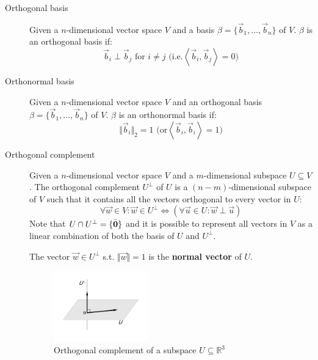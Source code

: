 \begin{description}
    \item[Orthogonal basis] 
        Given a $n$-dimensional vector space $V$ and a basis $\beta = \{ \vec{b}_1, \dots, \vec{b}_n \}$ of $V$.
        $\beta$ is an orthogonal basis if:
        \[ \vec{b}_i \perp \vec{b}_j \text{ for } i \neq j \text{ (i.e.} \left\langle \vec{b}_i, \vec{b}_j \right\rangle = 0 \text{)} \]

    \item[Orthonormal basis] 
        Given a $n$-dimensional vector space $V$ and an orthogonal basis $\beta = \{ \vec{b}_1, \dots, \vec{b}_n \}$ of $V$.
        $\beta$ is an orthonormal basis if:
        \[ \Vert \vec{b}_i \Vert_2 = 1 \text{ (or} \left\langle \vec{b}_i, \vec{b}_i \right\rangle = 1 \text{)} \]
    
    \item[Orthogonal complement] 
        Given a $n$-dimensional vector space $V$ and a $m$-dimensional subspace $U \subseteq V$.
        The orthogonal complement $U^\perp$ of $U$ is a $(n-m)$-dimensional subspace of $V$ such that it
        contains all the vectors orthogonal to every vector in $U$:
        \[ \forall \vec{w} \in V: \vec{w} \in U^\perp \iff (\forall \vec{u} \in U: \vec{w} \perp \vec{u}) \]
        Note that $U \cap U^\perp = \{ \bar{{\bm{0}}} \}$ and 
        it is possible to represent all vectors in $V$ as a linear combination of both the basis of $U$ and $U^\perp$.
        
        The vector $\vec{w} \in U^\perp$ s.t. $\Vert \vec{w} \Vert = 1$ is the \textbf{normal vector} of $U$. 
        \begin{figure}[h]
            \centering
            \includegraphics[width=0.4\textwidth]{img/_orthogonal_complement.pdf}
            \caption{Orthogonal complement of a subspace $U \subseteq \mathbb{R}^3$}
        \end{figure}
\end{description}



